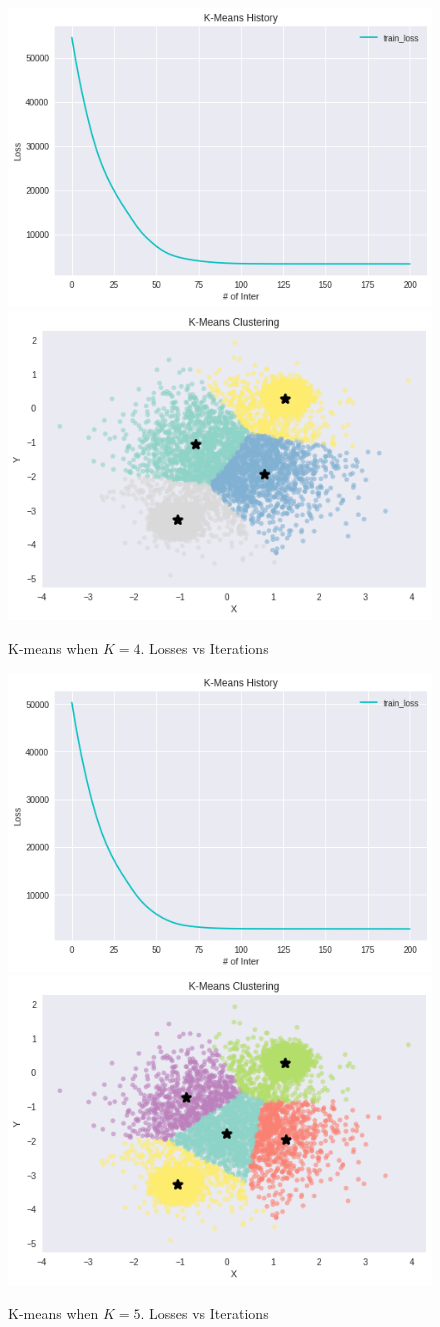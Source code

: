 \documentclass[10pt,letterpaper]{article}
\begin{document}
\begin{figure}[H]
\centering

  \includegraphics[width=.42\linewidth]{imgs/1_2_k4l.png}
  \includegraphics[width=.42\linewidth]{imgs/1_2_k4p.png}
  \caption{K-means when $K=4$. Losses vs Iterations}
  

\end{figure}

\begin{figure}[H]
\centering

  \includegraphics[width=.42\linewidth]{imgs/1_2_k5l.png}
  \includegraphics[width=.42\linewidth]{imgs/1_2_k5p.png}
  \caption{K-means when $K=5$. Losses vs Iterations}
  
\end{figure}



\subsection{}
\end{document}
